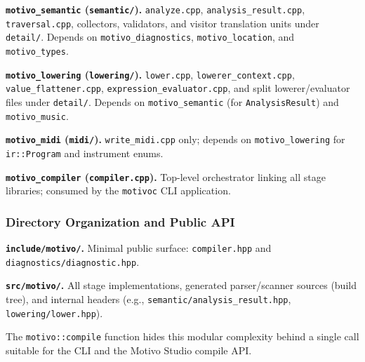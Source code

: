 \noindent \textbf{\texttt{motivo\_semantic} (\texttt{semantic/}).} \texttt{analyze.cpp}, \texttt{analysis\_result.cpp},
\texttt{traversal.cpp}, collectors, validators, and visitor translation units under \texttt{detail/}.
Depends on \texttt{motivo\_diagnostics}, \texttt{motivo\_location}, and \texttt{motivo\_types}.

\noindent \textbf{\texttt{motivo\_lowering} (\texttt{lowering/}).} \texttt{lower.cpp}, \texttt{lowerer\_context.cpp},
\texttt{value\_flattener.cpp}, \texttt{expression\_evaluator.cpp}, and split lowerer/evaluator files under
\texttt{detail/}.
Depends on \texttt{motivo\_semantic} (for \texttt{AnalysisResult}) and \texttt{motivo\_music}.

\noindent \textbf{\texttt{motivo\_midi} (\texttt{midi/}).} \texttt{write\_midi.cpp} only; depends on
\texttt{motivo\_lowering} for \texttt{ir::Program} and instrument enums.

\noindent \textbf{\texttt{motivo\_compiler} (\texttt{compiler.cpp}).} Top-level orchestrator linking all stage
libraries; consumed by the \texttt{motivoc} CLI application.

\subsubsection{Directory Organization and Public API}

\noindent \textbf{\texttt{include/motivo/}.} Minimal public surface: \texttt{compiler.hpp} and
\texttt{diagnostics/diagnostic.hpp}.

\noindent \textbf{\texttt{src/motivo/}.} All stage implementations, generated parser/scanner sources (build tree), and
internal headers (e.g., \texttt{semantic/analysis\_result.hpp}, \texttt{lowering/lower.hpp}).

The \texttt{motivo::compile} function hides this modular complexity behind a single call suitable for the CLI and the
Motivo Studio compile API.

